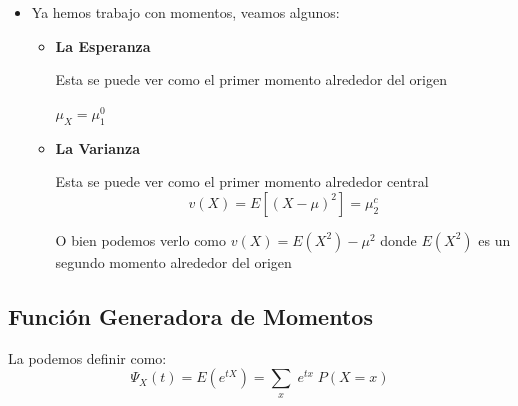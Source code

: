 \documentclass[12pt, fleqn]{report}                             %
\theoremstyle{break}                                            %
\begin{document}
                \begin{itemize}

                    \item
                        Ya hemos trabajo con momentos, veamos algunos:

                        \begin{itemize}
                            \item 
                                \textbf{La Esperanza}

                                Esta se puede ver como el primer momento alrededor del origen

                                $\mu_X = \mu_1^0$

                            \item 
                                \textbf{La Varianza}

                                Esta se puede ver como el primer momento alrededor central
                                \begin{equation*}
                                    v(X) = E[(X - \mu)^2] = \mu_2^c    
                                \end{equation*}

                                O bien podemos verlo como $v(X) = E(X^2) - \mu^2$ donde $E(X^2)$
                                es un segundo momento alrededor del origen

                         \end{itemize}

                \end{itemize}


            \clearpage
            \subsection{Función Generadora de Momentos}

                La podemos definir como:
                \begin{equation*}
                    \Psi_X (t) 
                        = E(e^{tX})
                        = \sum_x \; e^{tx} \; P(X = x)
                \end{equation*}
\end{document}
